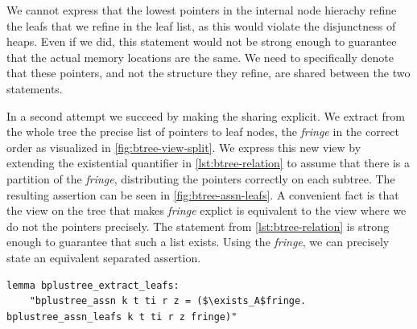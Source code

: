 \documentclass[a4paper,UKenglish,cleveref, autoref, thm-restate]{lipics-v2021}
\begin{document}

We cannot express that the lowest pointers
in the internal node hierachy refine the leafs
that we refine in the leaf list,
as this would violate the disjunctness of heaps.
Even if we did, this statement would not be strong enough
to guarantee that the actual memory locations
are the same.
We need to specifically denote that these pointers,
and not the structure they refine,
are shared between the two statements.

In a second attempt we succeed by making the sharing explicit.
We extract from the whole tree the precise list of pointers to leaf nodes, the \emph{fringe}
in the correct order as visualized in \autoref{fig:btree-view-split}.
We express this new view by extending the existential quantifier in \autoref{lst:btree-relation}
to assume that there is a partition of the \emph{fringe},
distributing the pointers correctly on each subtree.
The resulting assertion can be seen in \autoref{fig:btree-assn-leafs}.
A convenient fact is that the view on the tree that makes \emph{fringe} explict
is equivalent to the view where we do not the pointers precisely.
The statement from \autoref{lst:btree-relation} is strong enough to guarantee that such a list exists.
Using the \emph{fringe}, we can precisely state an equivalent separated assertion.

\begin{lstlisting}[mathescape=true, language=Isabelle,label=lst:btree-extract-leafs]
lemma bplustree_extract_leafs:
    "bplustree_assn k t ti r z = ($\exists_A$fringe. bplustree_assn_leafs k t ti r z fringe)"
\end{lstlisting}
\end{document}

